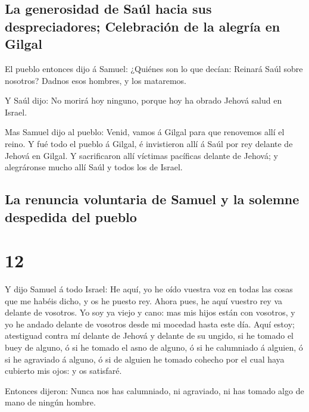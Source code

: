 \hypertarget{la-generosidad-de-sauxfal-hacia-sus-despreciadores-celebraciuxf3n-de-la-alegruxeda-en-gilgal}{%
\subsection{La generosidad de Saúl hacia sus despreciadores; Celebración
de la alegría en
Gilgal}\label{la-generosidad-de-sauxfal-hacia-sus-despreciadores-celebraciuxf3n-de-la-alegruxeda-en-gilgal}}

 El pueblo entonces dijo á Samuel: ¿Quiénes son lo que
decían: Reinará Saúl sobre nosotros? Dadnos esos hombres, y los
mataremos.

 Y Saúl dijo: No morirá hoy ninguno, porque hoy ha obrado
Jehová salud en Israel.

 Mas Samuel dijo al pueblo: Venid, vamos á Gilgal para que
renovemos allí el reino.  Y fué todo el pueblo á Gilgal, é
invistieron allí á Saúl por rey delante de Jehová en Gilgal. Y
sacrificaron allí víctimas pacíficas delante de Jehová; y alegráronse
mucho allí Saúl y todos los de Israel.

\hypertarget{la-renuncia-voluntaria-de-samuel-y-la-solemne-despedida-del-pueblo}{%
\subsection{La renuncia voluntaria de Samuel y la solemne despedida del
pueblo}\label{la-renuncia-voluntaria-de-samuel-y-la-solemne-despedida-del-pueblo}}

\hypertarget{section-11}{%
\section{12}\label{section-11}}

 Y dijo Samuel á todo Israel: He aquí, yo he oído vuestra
voz en todas las cosas que me habéis dicho, y os he puesto rey.
 Ahora pues, he aquí vuestro rey va delante de vosotros. Yo
soy ya viejo y cano: mas mis hijos están con vosotros, y yo he andado
delante de vosotros desde mi mocedad hasta este día.  Aquí
estoy; atestiguad contra mí delante de Jehová y delante de su ungido, si
he tomado el buey de alguno, ó si he tomado el asno de alguno, ó si he
calumniado á alguien, ó si he agraviado á alguno, ó si de alguien he
tomado cohecho por el cual haya cubierto mis ojos: y os satisfaré.

 Entonces dijeron: Nunca nos has calumniado, ni agraviado,
ni has tomado algo de mano de ningún hombre.

